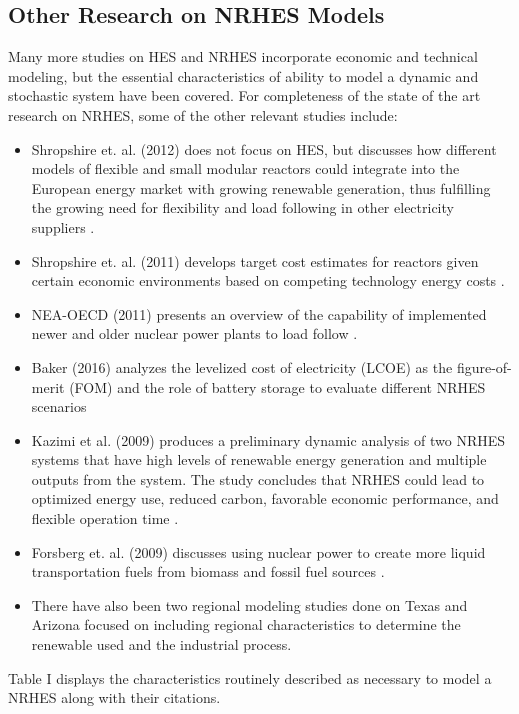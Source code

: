 \documentclass[12pt]{UIdahoMastersThesis}
\begin{document}
\subsection{Other Research on NRHES Models}
Many more studies on HES and NRHES incorporate economic and technical modeling, but the essential characteristics of ability to model a dynamic and stochastic system have been covered. For completeness of the state of the art research on NRHES, some of the other relevant studies include:
\begin{itemize}
\item Shropshire et. al. (2012) does not focus on HES, but discusses how different models of flexible and small modular reactors could integrate into the European energy market with growing renewable generation, thus fulfilling the growing need for flexibility and load following in other electricity suppliers \cite{Shropshire2012}.
\item Shropshire et. al. (2011) develops target cost estimates for reactors given certain economic environments based on competing technology energy costs \cite{Shropshire2011}.
\item NEA-OECD (2011) presents an overview of the capability of implemented newer and older nuclear power plants to load follow \cite{Nuclear2011}.
\item Baker (2016) analyzes the levelized cost of electricity (LCOE) as the figure-of-merit (FOM) and the role of battery storage to evaluate different NRHES scenarios \cite{Baker2016}
\item Kazimi et al. (2009) produces a preliminary dynamic analysis of two NRHES systems that have high levels of renewable energy generation and multiple outputs from the system. The study concludes that NRHES could lead to optimized energy use, reduced carbon, favorable economic performance, and flexible operation time \cite{Kazimi}.
\item Forsberg et. al. (2009) discusses using nuclear power to create more liquid transportation fuels from biomass and fossil fuel sources \cite{Forsberg2009}.
\item There have also been two regional modeling studies done on Texas and Arizona focused on including regional characteristics to determine the renewable used and the industrial process.
\end{itemize}
Table I displays the characteristics routinely described as necessary to model a NRHES along with their citations.
\end{document}
